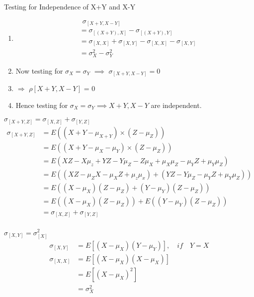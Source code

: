 \documentclass[10pt]{beamer}
\begin{document}
\begin{frame}{Testing for Independence of X+Y and X-Y}
\begin{enumerate}
\item \begin{align*}
& \hspace{5pt} \sigma_{[X+Y, X-Y]}\\
&= \sigma_{[(X+Y), X]}- \sigma_{[(X+Y), Y]} \\
&= \sigma_{[X,X]} + \sigma_{[X,Y]} - \sigma_{[X,X]} - \sigma_{[X,Y]}  \\
&= \sigma_X^2 - \sigma_Y^2
\end{align*}
\item Now testing for $\sigma_X = \sigma_Y $ $\implies$ $\sigma_{[X+Y,X-Y]}= 0$
\item $\Rightarrow$ $\rho[X+Y,X-Y]$ =  0
\item Hence testing for   $\sigma_X = \sigma_Y \implies X+Y, X-Y$ are independent.
\end{enumerate}
\end{frame}

\begin{frame}{$\sigma_{[X+Y,Z]} = \sigma_{[X,Z]} + \sigma_{[Y,Z]}$}
    \begin{align*}
        \sigma_{[X+Y,Z]} &= E((X+Y - \mu_{X+Y}) \times (Z -\mu_{Z} ))\\
        &= E((X+Y - \mu_{X}-\mu_{Y}) \times (Z -\mu_{Z} ))\\
        &= E(XZ-X\mu_z+YZ-Y\mu_Z-Z\mu_X+\mu_X\mu_Z-\mu_YZ+\mu_Y\mu_Z)\\
        &= E((XZ-\mu_ZX-\mu_XZ+\mu_z\mu_x) + (YZ-Y\mu_Z-\mu_YZ+\mu_Y\mu_Z))\\
        &= E((X-\mu_X)(Z-\mu_Z)+ (Y-\mu_Y)(Z-\mu_Z))\\
        &= E((X-\mu_X)(Z-\mu_Z)) + E((Y-\mu_Y)(Z-\mu_Z))\\
        &=\sigma_{[X,Z]} + \sigma_{[Y,Z]}\\
    \end{align*}
\end{frame}

\begin{frame}{$\sigma_{[X,Y]}= \sigma_{[X]}^2$}
        \begin{align*}
        \sigma_{[X,Y]} &= E[(X-\mu_X) (Y-\mu_Y)],
        \quad \textit{if}\quad Y=X \\
        \sigma_{[X,X]} &= E[(X-\mu_X) (X-\mu_X)]\\
        &=E[(X-\mu_X)^2]\\
        &=\sigma_X^2
    \end{align*}
\end{frame}
\end{document}
